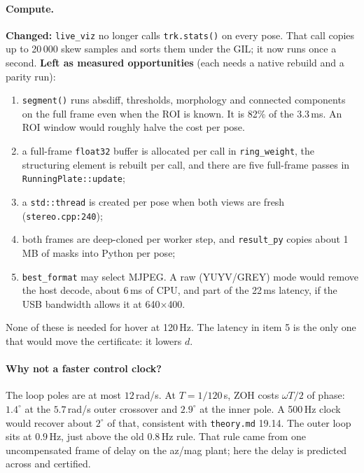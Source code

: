 \documentclass[11pt]{article}
\begin{document}
\paragraph{Compute.} \textbf{Changed:} \texttt{live\_viz} no longer calls \texttt{trk.stats()} on every pose.
That call copies up to 20\,000 skew samples and sorts them under the GIL; it now runs once a second.
\textbf{Left as measured opportunities} (each needs a native rebuild and a parity run):
\begin{enumerate}[leftmargin=*]
\item \texttt{segment()} runs absdiff, thresholds, morphology and connected components on the full
  frame even when the ROI is known. It is 82\% of the 3.3\,ms. An ROI window would roughly halve
  the cost per pose.
\item a full-frame \texttt{float32} buffer is allocated per call in \texttt{ring\_weight}, the structuring
  element is rebuilt per call, and there are five full-frame passes in \texttt{RunningPlate::update};
\item a \texttt{std::thread} is created per pose when both views are fresh (\texttt{stereo.cpp:240});
\item both frames are deep-cloned per worker step, and \texttt{result\_py} copies about 1\,MB of masks into Python per pose;
\item \texttt{best\_format} may select MJPEG. A raw (YUYV/GREY) mode would remove the host decode,
  about 6\,ms of CPU, and part of the 22\,ms latency, if the USB bandwidth allows it at 640$\times$400.
\end{enumerate}
None of these is needed for hover at 120\,Hz. The latency in item 5 is the only one that would move
the certificate: it lowers $d$.

\paragraph{Why not a faster control clock?} The loop poles are at most $12$\,rad/s. At $T=1/120$\,s,
ZOH costs $\omega T/2$ of phase: $1.4^\circ$ at the $5.7$\,rad/s outer crossover and $2.9^\circ$ at the
inner pole. A 500\,Hz clock would recover about $2^\circ$ of that, consistent with \texttt{theory.md}
19.14. The outer loop sits at $0.9$\,Hz, just above the old $0.8$\,Hz rule. That rule came from one
uncompensated frame of delay on the az/mag plant; here the delay is predicted across and certified.
\end{document}
